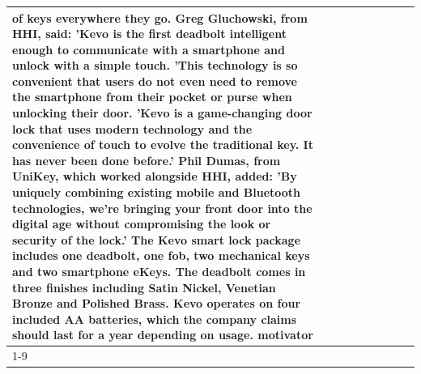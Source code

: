\begin{table}[H]
\begin{tabular}{lllrlllll}
of keys everywhere they go. Greg Gluchowski, from HHI, said: 'Kevo is the first deadbolt intelligent enough to communicate with a smartphone and unlock with a simple touch. 'This technology is so convenient that users do not even need to remove the smartphone from their pocket or purse when unlocking their door. 'Kevo is a game-changing door lock that uses modern technology and the convenience of touch to evolve the traditional key. It has never been done before.' Phil Dumas, from UniKey, which worked alongside HHI, added: 'By uniquely combining existing mobile and Bluetooth technologies, we’re bringing your front door into the digital age without compromising the look or security of the lock.' The Kevo smart lock package includes one deadbolt, one fob, two mechanical keys and two smartphone eKeys. The deadbolt comes in three finishes including Satin Nickel, Venetian Bronze and Polished Brass. Kevo operates on four included AA batteries, which the company claims should last for a year depending on usage. motivator \\
\cline{1-9}

\end{tabular}
\end{table}
